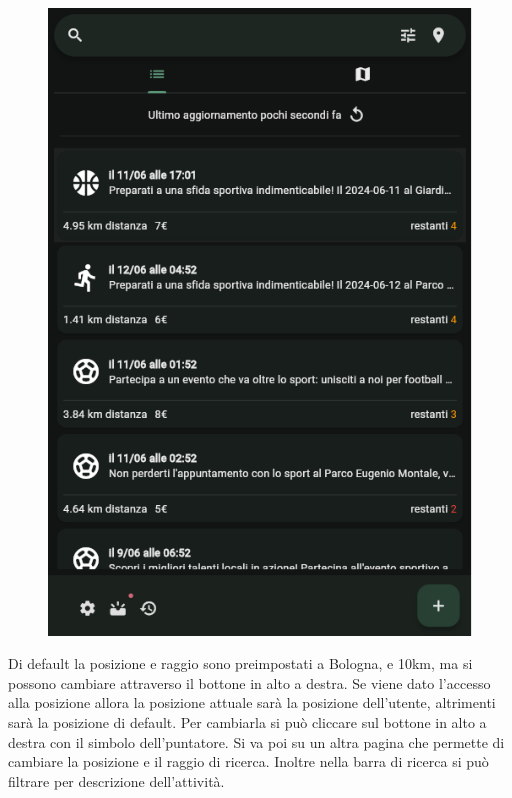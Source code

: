 \documentclass[a4paper,12pt]{article}
\begin{document}
\begin{figure}[h]
\begin{minipage}{0.32\textwidth}
        \includegraphics[width=1\linewidth]{img/Search.png}
    \end{minipage}
\end{figure}

Di default la posizione e raggio sono preimpostati a Bologna, e 10km, ma si possono cambiare attraverso il bottone in alto a destra.
Se viene dato l'accesso alla posizione allora la posizione attuale sarà la posizione dell'utente, altrimenti sarà la posizione di default.
Per cambiarla si può cliccare sul bottone in alto a destra con il simbolo dell'puntatore. Si va poi su un altra pagina che permette di cambiare la posizione e il raggio di ricerca.
Inoltre nella barra di ricerca si può filtrare per descrizione dell'attività.
\end{document}
